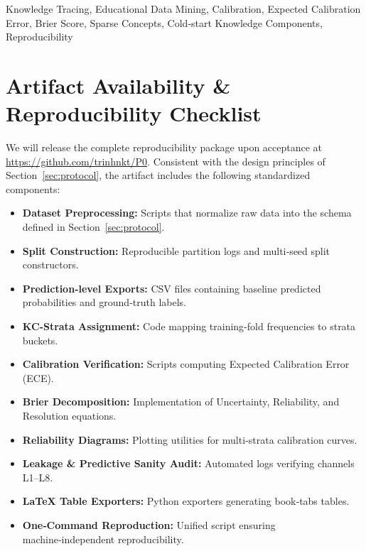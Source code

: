 \documentclass[conference]{IEEEtran}
\begin{document}
\begin{IEEEkeywords}
Knowledge Tracing, Educational Data Mining, Calibration, Expected Calibration Error, Brier Score, Sparse Concepts, Cold‑start Knowledge Components, Reproducibility
\end{IEEEkeywords}








\section*{Artifact Availability \& Reproducibility Checklist}
We will release the complete reproducibility package upon acceptance at \url{https://github.com/trinhnkt/P0}. Consistent with the design principles of Section~\ref{sec:protocol}, the artifact includes the following standardized components:
\begin{itemize}
  \item \textbf{Dataset Preprocessing:} Scripts that normalize raw data into the schema defined in Section~\ref{sec:protocol}.
  \item \textbf{Split Construction:} Reproducible partition logs and multi‑seed split constructors.
  \item \textbf{Prediction‑level Exports:} CSV files containing baseline predicted probabilities and ground‑truth labels.
  \item \textbf{KC‑Strata Assignment:} Code mapping training‑fold frequencies to strata buckets.
  \item \textbf{Calibration Verification:} Scripts computing Expected Calibration Error (ECE).
  \item \textbf{Brier Decomposition:} Implementation of Uncertainty, Reliability, and Resolution equations.
  \item \textbf{Reliability Diagrams:} Plotting utilities for multi‑strata calibration curves.
  \item \textbf{Leakage \& Predictive Sanity Audit:} Automated logs verifying channels L1--L8.
  \item \textbf{LaTeX Table Exporters:} Python exporters generating book‑tabs tables.
  \item \textbf{One‑Command Reproduction:} Unified script ensuring machine‑independent reproducibility.
\end{itemize}

\appendices




\end{document}
